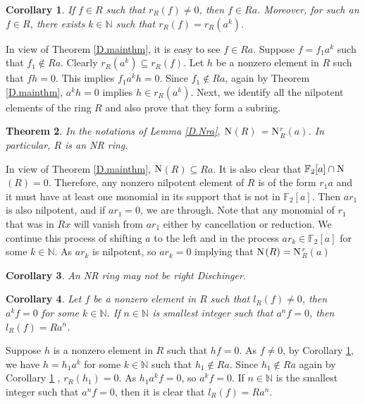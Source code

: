 \documentclass[12pt]{article}
\makeatletter
\theoremstyle{plain}
\newtheorem{thm}{Theorem}[section]
\newtheorem{cor}[thm]{Corollary}
\theoremstyle{definition}
\renewenvironment{proof}[1][\proofname]{%
	\par\pushQED{\qed}%
	\normalfont %
	\topsep6\p@\@plus6\p@\relax
	\trivlist
	\item[\hskip\labelsep\bfseries #1\@addpunct{.}]%
}{%
	\popQED\endtrivlist\@endpefalse
}
\renewcommand{\proofname}{Proof}
\makeatother
\begin{document}
	\begin{cor}\label{D.rann}
		If $f\in R$ such that $r_R(f) \neq 0$, then $f \in Ra$. Moreover, for such an $f \in R$, there exists $k \in \mathbb{N}$ such that $r_R(f)= r_R(a^k)$.
	\end{cor}
	\begin{proof}
		In view of Theorem \ref{D.mainthm}, it is easy to see $f \in Ra$. Suppose $f=f_1a^k$ such that $f_1 \notin Ra$. Clearly $r_R(a^k) \subseteq r_R(f)$. Let $h$ be a nonzero element in $R$ such that $fh=0$. This implies $f_1a^kh=0$. Since $f_1 \notin Ra$, again by Theorem  \ref{D.mainthm}, $a^kh=0$ implies $h \in r_R(a^k)$. 
	\end{proof}
	Next, we identify all the nilpotent elements of the ring $R$ and also prove that they form a subring.
	\begin{thm}\label{D.nr}
		In the notations of Lemma \ref{D.Nra}, $\rm{N}$$(R)$ = $\rm{N}$$^r_R$$(a)$. In particular, $R$ is an NR ring.
	\end{thm}
	\begin{proof}
		In view of Theorem \ref{D.mainthm}, $\rm{N}$$(R) \subseteq Ra$. It is also clear that $\mathbb{F}_2[a] \cap \rm{N}$$(R) = 0$. Therefore, any nonzero nilpotent element of $R$ is of the form $r_1a$ and it must have at least one monomial in its support that is not in $\mathbb{F}_2[a]$. Then $ar_1$ is also nilpotent, and if $ar_1 = 0$, we are through. Note that any monomial of $r_1$ that was in $Rx$ will vanish from $ar_1$ either by cancellation or reduction. We continue this process of shifting $a$ to the left and in the process  $ar_k \in \mathbb{F}_2[a]$  for some $k \in \mathbb{N}$. As $ar_k$ is nilpotent, so $ar_k = 0$ implying that $\rm{N}$$(R) = \rm{N}$$^r_R$$(a)$
	\end{proof}
	\begin{cor}\label{D.nr1}
		An NR ring may not be right Dischinger.
	\end{cor}
	\begin{cor}\label{D.lann}
		Let $f$ be a nonzero element in $R$ such that $l_R(f) \neq 0$, then $a^kf = 0$ for some $k \in \mathbb{N}$.  If $n \in \mathbb{N}$ is smallest integer such that $a^nf = 0$, then $l_R(f) = Ra^n$.
	\end{cor}
	\begin{proof}
		Suppose $h$ is a nonzero element in $R$ such that $hf = 0$. As $f \neq 0$, by Corollary \ref{D.rann}, we have $h = h_1a^k$ for some $k \in \mathbb{N}$ such that $h_1 \notin Ra$. Since  $h_1 \notin Ra$ again by Corollary \ref{D.rann} , $r_R(h_1) = 0$. As $h_1a^kf = 0$, so $a^kf=0$. If $n \in \mathbb{N}$ is the smallest integer such that $a^nf=0$, then it is clear that $l_R(f) = Ra^n$. 	
	\end{proof}
\end{document}
